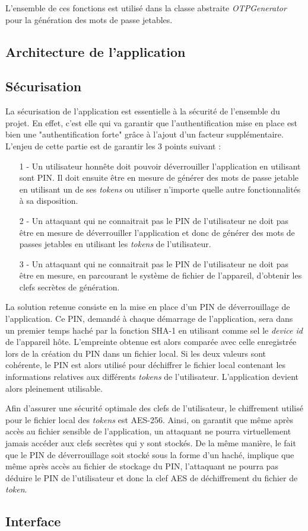 L'ensemble de ces fonctions est utilisé dans la classe abstraite \emph{OTPGenerator} pour la
génération des mots de passe jetables.

\subsection{Architecture de l'application}

\subsection{Sécurisation}
La sécurisation de l'application est essentielle à la sécurité de l'ensemble du projet. En
effet, c'est elle qui va garantir que l'authentification mise en place est bien une
"authentification forte" grâce à l'ajout d'un facteur supplémentaire. L'enjeu de cette
partie est de garantir les 3 points suivant :


\begin{itemize}
  \item[1 -] Un utilisateur honnête doit pouvoir déverrouiller l'application en utilisant
  sont PIN. Il doit ensuite être en mesure de générer des mots de passe jetable en utilisant
  un de ses \emph{tokens} ou utiliser n'importe quelle autre fonctionnalités à sa
  disposition.
  \item[2 -] Un attaquant qui ne connaitrait pas le PIN de l'utilisateur ne doit pas être en
  mesure de déverrouiller l'application et donc de générer des mots de passes jetables en
  utilisant les \emph{tokens} de l'utilisateur.
  \item[3 -] Un attaquant qui ne connaitrait pas le PIN de l'utilisateur ne doit pas être en
  mesure, en parcourant le système de fichier de l'appareil, d'obtenir les clefs secrètes
  de génération.
\end{itemize}

La solution retenue consiste en la mise en place d'un PIN de déverrouillage de l'application.
Ce PIN, demandé à chaque démarrage de l'application, sera dans un premier temps haché par la
fonction SHA-1 en utilisant comme sel le \emph{device id} de l'appareil hôte. L'empreinte
obtenue est alors comparée avec celle enregistrée lors de la création du PIN dans un fichier
local. Si les deux valeurs sont cohérente, le PIN est alors utilisé pour déchiffrer le
fichier local contenant les informations relatives aux différents \emph{tokens} de
l'utilisateur. L'application devient alors pleinement utilisable.

Afin d'assurer une sécurité optimale des clefs de l'utilisateur, le chiffrement utilisé pour
le fichier local des \emph{tokens} est AES-256. Ainsi, on garantit que même après accès au
fichier sensible de l'application, un attaquant ne pourra virtuellement jamais accéder aux
clefs secrètes qui y sont stockés. De la même manière, le fait que le PIN de déverrouillage
soit stocké sous la forme d'un haché, implique que même après accès au fichier de stockage du
PIN, l'attaquant ne pourra pas déduire le PIN de l'utilisateur et donc la clef AES de
déchiffrement du fichier de \emph{token}.


\subsection{Interface}





